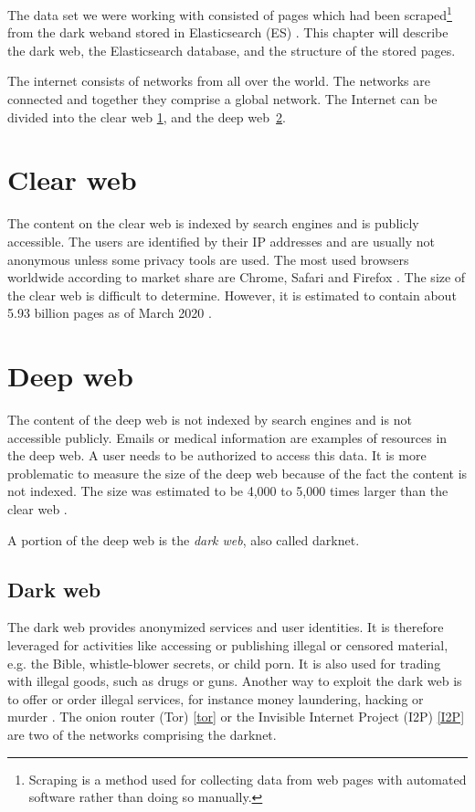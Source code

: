 The data set we were working with consisted of pages which had been scraped\footnote{Scraping is a method used for collecting data from web pages with automated software rather than doing so manually.} from the dark weband stored in Elasticsearch (ES) \cite{elasticSearch}. This chapter will describe the dark web, the Elasticsearch database, and the structure of the stored pages.

The internet consists of networks from all over the world. The networks are connected and together they comprise a global network. The Internet can be divided into the clear web \ref{clearWeb}, and the deep web~\ref{deepWeb}.

\section{Clear web} \label{clearWeb}
The content on the clear web is indexed by search engines and is publicly accessible. The users are identified by their IP addresses and are usually not anonymous unless some privacy tools are used. The most used browsers worldwide according to market share are Chrome, Safari and Firefox \cite{browserMarketShare}. The size of the clear web is difficult to determine. However, it is estimated to contain about 5.93 billion pages as of March 2020 \cite{clearWebSize}.

\section{Deep web} \label{deepWeb}
The content of the deep web is not indexed by search engines and is not accessible publicly. Emails or medical information are examples of resources in the deep web. A user needs to be authorized to access this data. It is more problematic to measure the size of the deep web because of the fact the content is not indexed. The size was estimated to be 4,000 to 5,000 times larger than the clear web \cite{deepWebSize}. 

A portion of the deep web is the \textit{dark web}, also called darknet. 

\subsection{Dark web} \label{darkWeb}
The dark web provides anonymized services and user identities. It is therefore leveraged for activities like accessing or publishing illegal or censored material, e.g. the Bible, whistle-blower secrets, or child porn. It is also used for trading with illegal goods, such as drugs or guns. Another way to exploit the dark web is to offer or order illegal services, for instance money laundering, hacking or murder \cite{theDarkNet}. The onion router (Tor) \ref{tor} or the Invisible Internet Project (I2P) \ref{I2P} are two of the networks comprising the darknet. 

